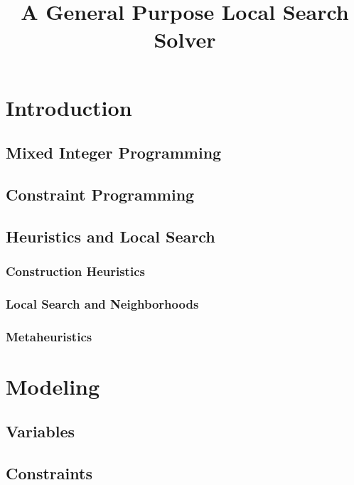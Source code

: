 \documentclass[a4paper,12pt]{article}
\title{A General Purpose Local Search Solver}
\begin{document}
\maketitle

\tableofcontents
\newpage
\section{Introduction}
  \subsection{Mixed Integer Programming}
  \subsection{Constraint Programming}
  \subsection{Heuristics and Local Search}
  \subsubsection{Construction Heuristics}
  \subsubsection{Local Search and Neighborhoods}
  \subsubsection{Metaheuristics}

\section{Modeling}

  \subsection{Variables} 
  
  \subsection{Constraints}
  
\end{document}

